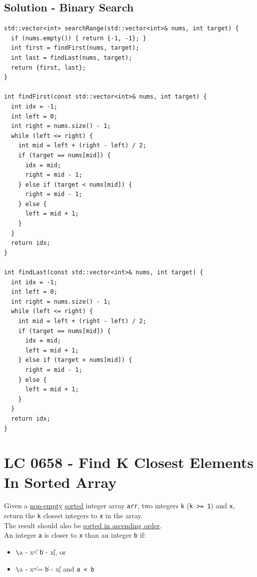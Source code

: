 \subsection*{Solution - Binary Search}
\begin{lstlisting}
std::vector<int> searchRange(std::vector<int>& nums, int target) {
  if (nums.empty()) { return {-1, -1}; }
  int first = findFirst(nums, target);
  int last = findLast(nums, target);
  return {first, last};
}

int findFirst(const std::vector<int>& nums, int target) {
  int idx = -1;
  int left = 0;
  int right = nums.size() - 1;
  while (left <= right) {
    int mid = left + (right - left) / 2;
    if (target == nums[mid]) {
      idx = mid;
      right = mid - 1;
    } else if (target < nums[mid]) {
      right = mid - 1;
    } else {
      left = mid + 1;
    }
  }
  return idx;
}

int findLast(const std::vector<int>& nums, int target) {
  int idx = -1;
  int left = 0;
  int right = nums.size() - 1;
  while (left <= right) {
    int mid = left + (right - left) / 2;
    if (target == nums[mid]) {
      idx = mid;
      left = mid + 1;
    } else if (target < nums[mid]) {
      right = mid - 1;
    } else {
      left = mid + 1;
    }
  }
  return idx;
}
\end{lstlisting}

\section{LC 0658 - Find K Closest Elements In Sorted Array}\label{lc0658}
Given a \ul{non-empty} \ul{sorted} integer array {\colorbox{CodeBackground}{\lstinline|arr|}}, two integers {\colorbox{CodeBackground}{\lstinline|k|}} ({\colorbox{CodeBackground}{\lstinline|k >= 1|}}) and {\colorbox{CodeBackground}{\lstinline|x|}}, return the {\colorbox{CodeBackground}{\lstinline|k|}} closest integers to {\colorbox{CodeBackground}{\lstinline|x|}} in the array. \\

The result should also be \ul{sorted in ascending order}.\\

An integer {\colorbox{CodeBackground}{\lstinline|a|}} is closer to {\colorbox{CodeBackground}{\lstinline|x|}} than an integer {\colorbox{CodeBackground}{\lstinline|b|}} if:
\begin{itemize}
\item {\colorbox{CodeBackground}{\lstinline|\|a - x\| < \|b - x\||}}, or
\item {\colorbox{CodeBackground}{\lstinline|\|a - x\| == \|b - x\||}} and {\colorbox{CodeBackground}{\lstinline|a < b|}}
\end{itemize}

